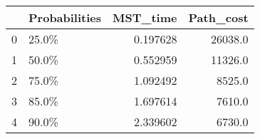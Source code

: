 \begin{tabular}{llrr}
\toprule
{} & Probabilities &  MST\_time &  Path\_cost \\
\midrule
0 &         25.0\% &  0.197628 &    26038.0 \\
1 &         50.0\% &  0.552959 &    11326.0 \\
2 &         75.0\% &  1.092492 &     8525.0 \\
3 &         85.0\% &  1.697614 &     7610.0 \\
4 &         90.0\% &  2.339602 &     6730.0 \\
\bottomrule
\end{tabular}
